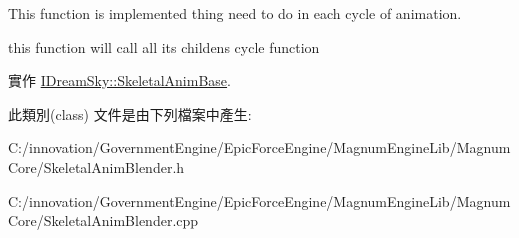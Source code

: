 This function is implemented thing need to do in each cycle of animation. 

this function will call all its childen\textquotesingle{}s cycle function 

實作 \hyperlink{class_i_dream_sky_1_1_skeletal_anim_base_ae27da4b47988780eea5012025fd91109}{I\+Dream\+Sky\+::\+Skeletal\+Anim\+Base}.



此類別(class) 文件是由下列檔案中產生\+:\begin{DoxyCompactItemize}
\item 
C\+:/innovation/\+Government\+Engine/\+Epic\+Force\+Engine/\+Magnum\+Engine\+Lib/\+Magnum\+Core/Skeletal\+Anim\+Blender.\+h\item 
C\+:/innovation/\+Government\+Engine/\+Epic\+Force\+Engine/\+Magnum\+Engine\+Lib/\+Magnum\+Core/Skeletal\+Anim\+Blender.\+cpp\end{DoxyCompactItemize}
